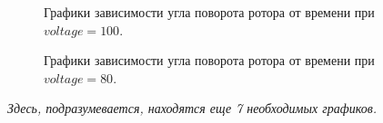 \documentclass[12pt,titlepage,a4paper]{article}
\begin{document}
\begin{figure}[h]
	\noindent{}
	\caption{Графики зависимости угла поворота ротора от времени при $voltage=100$.}
\end{figure} 
\pagebreak
\begin{figure}[h]
	\noindent{}
	\caption{Графики зависимости угла поворота ротора от времени при $voltage=80$.}
\end{figure}
\addtocounter{figure}{7}
\begin{center}
\itshape Здесь, подразумевается, находятся еще 7 необходимых графиков.
\end{center}
\end{document}
